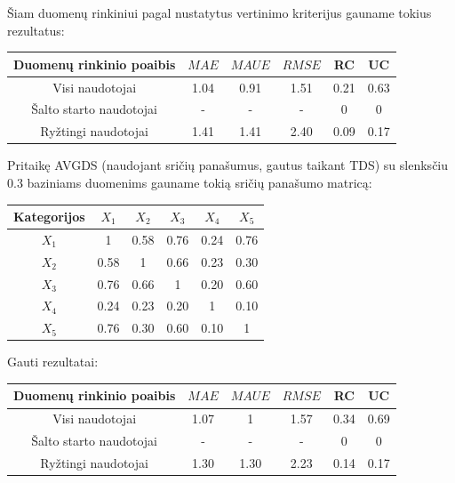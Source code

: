 \documentclass{VUMIFInfMagistrinis}
\begin{document}
\indent
Šiam duomenų rinkiniui pagal nustatytus vertinimo kriterijus gauname tokius rezultatus:
\begin{center}
	\begin{tabular}{||c c c c c c||} 
		Duomenų rinkinio poaibis & $MAE$ & $MAUE$ & $RMSE$ & RC & UC \\
		\hline
		Visi naudotojai & 1.04 & 0.91 & 1.51 & 0.21 & 0.63 \\
		\hline
		Šalto starto naudotojai & - & - & - & 0 & 0 \\
		\hline
		Ryžtingi naudotojai & 1.41 & 1.41 & 2.40 & 0.09 & 0.17 \\
		
	\end{tabular}
\end{center}
\indent
Pritaikę AVGDS (naudojant sričių panašumus, gautus taikant TDS) su slenksčiu 0.3 baziniams duomenims gauname tokią sričių panašumo matricą:
\begin{center}
	\begin{tabular}{||c c c c c c||} 
		\hline
		Kategorijos & $X_1$ & $X_2$ & $X_3$ & $X_4$ & $X_5$ \\ [0.5ex] 
		\hline\hline
		$X_1$ & 1 & 0.58 & 0.76 & 0.24 & 0.76 \\ 
		\hline
		$X_2$ & 0.58 & 1 & 0.66 & 0.23 & 0.30 \\
		\hline
		$X_3$ & 0.76 & 0.66 & 1 & 0.20 & 0.60 \\
		\hline
		$X_4$ & 0.24 & 0.23 & 0.20 & 1 & 0.10 \\
		\hline
		$X_5$ & 0.76 & 0.30 & 0.60 & 0.10 & 1 \\ [1ex] 
		\hline
	\end{tabular}
\end{center}
Gauti rezultatai:
\begin{center}
	\begin{tabular}{||c c c c c c||} 
		Duomenų rinkinio poaibis & $MAE$ & $MAUE$ & $RMSE$ & RC & UC \\
		\hline
		Visi naudotojai & 1.07 & 1 & 1.57 & 0.34 & 0.69 \\
		\hline
		Šalto starto naudotojai & - & - & - & 0 & 0 \\
		\hline
		Ryžtingi naudotojai & 1.30 & 1.30 & 2.23 & 0.14 & 0.17 \\
		
	\end{tabular}
\end{center}
\end{document}
